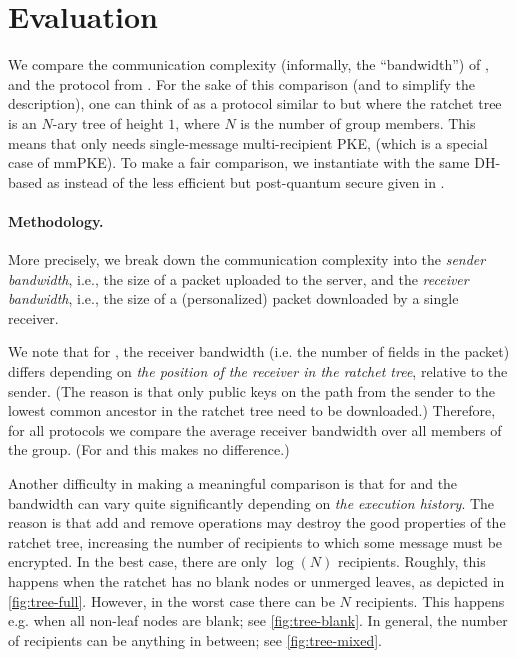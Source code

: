 
\section{Evaluation}\label{sec:eval}
We compare the communication complexity (informally, the ``bandwidth'') of \saik, \protITK and the \protCMPKE
protocol from \cite{hashimoto2021cmpke}. For the sake of this comparison (and to simplify the description), one
can think of \protCMPKE as a protocol similar to \saik but where the ratchet tree is an $N$-ary tree of height $1$, where $N$ is the number of group members.
This means that \protCMPKE only needs single-message multi-recipient PKE, \mPKE (which is a special case of mmPKE).
To make a fair comparison, we instantiate \protCMPKE with the same DH-based \mPKE as \saik
instead of the less efficient but post-quantum secure \mPKE
given in \cite{hashimoto2021cmpke}.


\paragraph{Methodology.}
More precisely, we break down the communication complexity into the \emph{sender bandwidth}, i.e., the size of a packet uploaded to the server, and the \emph{receiver bandwidth}, i.e., the size of a (personalized) packet downloaded by a single receiver.

We note that for \saik, the receiver bandwidth (i.e. the number of fields in the packet) differs depending on \emph{the position of the receiver in the ratchet tree}, relative to the sender. (The reason is that only public keys on the path from the sender to the lowest common ancestor in the ratchet tree need to be downloaded.) Therefore, for all protocols we compare the average receiver bandwidth over all members of the group. (For \protITK and \protCMPKE this makes no difference.)

Another difficulty in making a meaningful comparison is that for \saik and \protITK the bandwidth can vary quite
significantly depending on \emph{the execution history}. The reason is that add and remove operations may destroy the
good properties of the ratchet tree, increasing the number of recipients to which some message must be encrypted. In the
best case, there are only $\log(N)$ recipients. Roughly, this happens when the ratchet has no blank nodes or unmerged
leaves, as depicted in \cref{fig:tree-full}. However, in the worst case there can be $N$ recipients. This happens e.g. when all
non-leaf nodes are blank; see \cref{fig:tree-blank}. In general, the number of recipients can be anything in between;
see \cref{fig:tree-mixed}.

